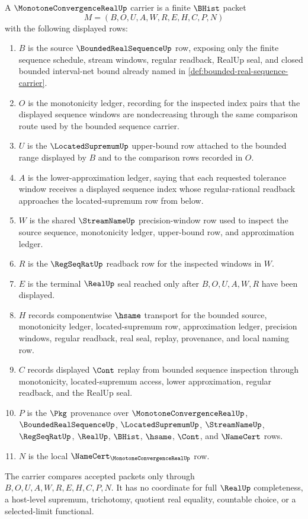 \begin{definition}
\label{def:monotone-convergence-real-carrier}
A $\MonotoneConvergenceRealUp$ carrier is a finite $\BHist$ packet
$$
M=(B,O,U,A,W,R,E,H,C,P,N)
$$
with the following displayed rows:
\begin{enumerate}
\item $B$ is the source $\BoundedRealSequenceUp$ row, exposing only the finite sequence schedule, stream windows, regular readback, RealUp seal, and closed bounded interval-net bound already named in \autoref{def:bounded-real-sequence-carrier}.
\item $O$ is the monotonicity ledger, recording for the inspected index pairs that the displayed sequence windows are nondecreasing through the same comparison route used by the bounded sequence carrier.
\item $U$ is the $\LocatedSupremumUp$ upper-bound row attached to the bounded range displayed by $B$ and to the comparison rows recorded in $O$.
\item $A$ is the lower-approximation ledger, saying that each requested tolerance window receives a displayed sequence index whose regular-rational readback approaches the located-supremum row from below.
\item $W$ is the shared $\StreamNameUp$ precision-window row used to inspect the source sequence, monotonicity ledger, upper-bound row, and approximation ledger.
\item $R$ is the $\RegSeqRatUp$ readback row for the inspected windows in $W$.
\item $E$ is the terminal $\RealUp$ seal reached only after $B,O,U,A,W,R$ have been displayed.
\item $H$ records componentwise $\hsame$ transport for the bounded source, monotonicity ledger, located-supremum row, approximation ledger, precision windows, regular readback, real seal, replay, provenance, and local naming row.
\item $C$ records displayed $\Cont$ replay from bounded sequence inspection through monotonicity, located-supremum access, lower approximation, regular readback, and the RealUp seal.
\item $P$ is the $\Pkg$ provenance over $\MonotoneConvergenceRealUp$, $\BoundedRealSequenceUp$, $\LocatedSupremumUp$, $\StreamNameUp$, $\RegSeqRatUp$, $\RealUp$, $\BHist$, $\hsame$, $\Cont$, and $\NameCert$ rows.
\item $N$ is the local $\NameCert_{\MonotoneConvergenceRealUp}$ row.
\end{enumerate}
The carrier compares accepted packets only through $B,O,U,A,W,R,E,H,C,P,N$. It has no coordinate for full $\RealUp$ completeness, a host-level supremum, trichotomy, quotient real equality, countable choice, or a selected-limit functional.
\end{definition}

